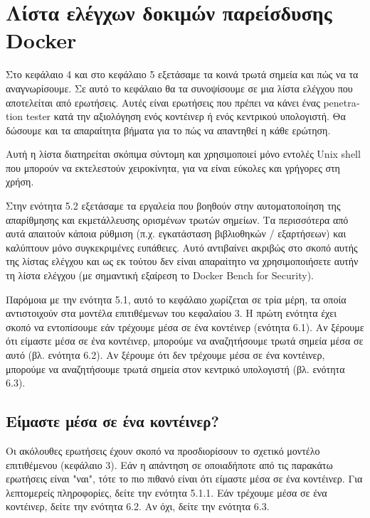 \chapter{Λίστα ελέγχων δοκιμών παρείσδυσης \textlatin{Docker}}
\label{dockerPenTestChecklist}

Στο κεφάλαιο 4 και στο κεφάλαιο 5 εξετάσαμε τα κοινά τρωτά σημεία και πώς
να τα αναγνωρίσουμε. Σε αυτό το κεφάλαιο θα τα συνοψίσουμε σε μια λίστα ελέγχου
που αποτελείται από ερωτήσεις. Αυτές είναι ερωτήσεις που πρέπει να κάνει ένας
\textlatin{penetration tester} κατά την αξιολόγηση ενός κοντέινερ ή ενός
κεντρικού υπολογιστή. Θα δώσουμε και τα απαραίτητα βήματα για το πώς να
απαντηθεί η κάθε ερώτηση.

Αυτή η λίστα διατηρείται σκόπιμα σύντομη και χρησιμοποιεί μόνο εντολές
\textlatin{Unix shell} που μπορούν να εκτελεστούν χειροκίνητα, για να είναι
εύκολες και γρήγορες στη χρήση.

Στην ενότητα 5.2 εξετάσαμε τα εργαλεία που βοηθούν στην αυτοματοποίηση της
απαρίθμησης και εκμετάλλευσης ορισμένων τρωτών σημείων. Τα περισσότερα από αυτά
απαιτούν κάποια ρύθμιση (π.χ. εγκατάσταση βιβλιοθηκών / εξαρτήσεων) και
καλύπτουν μόνο συγκεκριμένες ευπάθειες. Αυτό αντιβαίνει ακριβώς στο σκοπό αυτής
της λίστας ελέγχου και ως εκ τούτου δεν είναι απαραίτητο να χρησιμοποιήσετε
αυτήν τη λίστα ελέγχου (με σημαντική εξαίρεση το
\textlatin{Docker Bench for Security}).

Παρόμοια με την ενότητα 5.1, αυτό το κεφάλαιο χωρίζεται σε τρία μέρη, τα οποία
αντιστοιχούν στα μοντέλα επιτιθέμενων του κεφαλαίου 3. Η πρώτη ενότητα έχει
σκοπό να εντοπίσουμε εάν τρέχουμε μέσα σε ένα κοντέινερ (ενότητα 6.1). Αν
ξέρουμε ότι είμαστε μέσα σε ένα κοντέινερ, μπορούμε να αναζητήσουμε τρωτά σημεία
μέσα σε αυτό (βλ. ενότητα 6.2). Αν ξέρουμε ότι δεν τρέχουμε μέσα σε ένα
κοντέινερ, μπορούμε να αναζητήσουμε τρωτά σημεία στον κεντρικό υπολογιστή (βλ.
ενότητα 6.3).

\section{Είμαστε μέσα σε ένα κοντέινερ?}

Οι ακόλουθες ερωτήσεις έχουν σκοπό να προσδιορίσουν το σχετικό μοντέλο
επιτιθέμενου (κεφάλαιο 3). Εάν η απάντηση σε οποιαδήποτε από τις παρακάτω
ερωτήσεις είναι "ναι", τότε το πιο πιθανό είναι ότι είμαστε μέσα σε ένα κοντέινερ.
Για λεπτομερείς πληροφορίες, δείτε την ενότητα 5.1.1. Εάν τρέχουμε μέσα σε ένα
κοντέινερ, δείτε την ενότητα 6.2. Αν όχι, δείτε την ενότητα 6.3. \\

